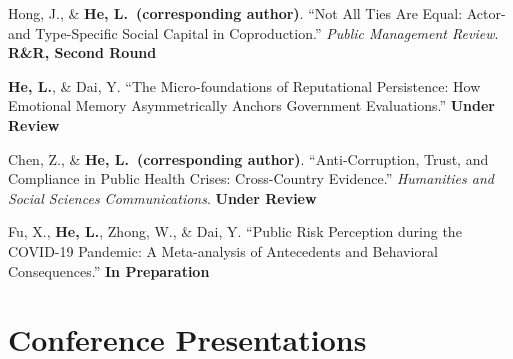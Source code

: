 \documentclass[11pt, a4paper]{article}
\begin{document}
\begin{enumerate}[label={[\arabic*]}]
    \item Hong, J., \& \textbf{He, L.\ (corresponding author)}.
    ``Not All Ties Are Equal: Actor- and Type-Specific Social Capital in Coproduction.''
    \textit{Public Management Review}.
    \hfill \textbf{R\&R, Second Round}

    \item \textbf{He, L.}, \& Dai, Y.
    ``The Micro-foundations of Reputational Persistence:
    How Emotional Memory Asymmetrically Anchors Government Evaluations.''
    \hfill \textbf{Under Review}

    \item Chen, Z., \& \textbf{He, L.\ (corresponding author)}.
    ``Anti-Corruption, Trust, and Compliance in Public Health Crises:
    Cross-Country Evidence.''
    \textit{Humanities and Social Sciences Communications}.
    \hfill \textbf{Under Review}

    \item Fu, X., \textbf{He, L.}, Zhong, W., \& Dai, Y.
    ``Public Risk Perception during the COVID-19 Pandemic:
    A Meta-analysis of Antecedents and Behavioral Consequences.''
    \hfill \textbf{In Preparation}
\end{enumerate}

\section{Conference Presentations}
\end{document}
